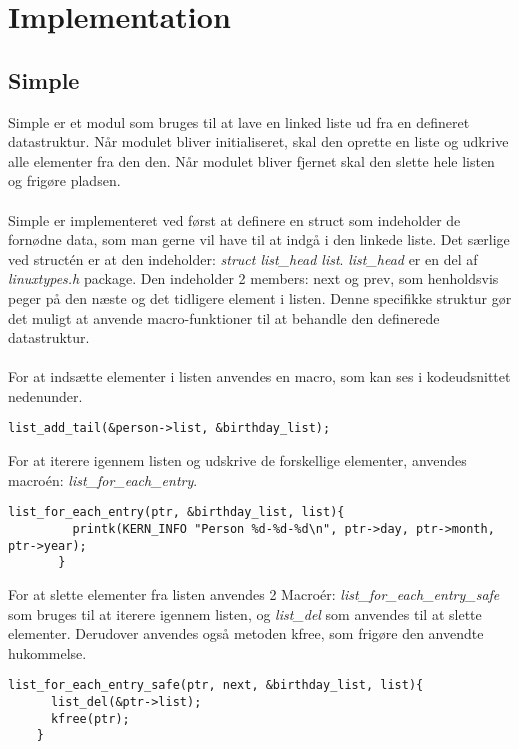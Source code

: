 \chapter{Implementation}
\section{Simple}
Simple er et modul som bruges til at lave en linked liste ud fra en defineret datastruktur. Når modulet bliver initialiseret, skal den oprette en liste og udkrive alle elementer fra den den. Når modulet bliver fjernet skal den slette hele listen og frigøre pladsen.
\\\\
Simple er implementeret ved først at definere en struct som indeholder de fornødne data, som man gerne vil have til at indgå i den linkede liste. Det særlige ved structén er at den indeholder: \textit{struct list\_head list}. \textit{list\_head} er en del af \textit{linux{types.h}} package. Den indeholder 2 members: next og prev, som henholdsvis peger på den næste og det tidligere element i listen. Denne specifikke struktur gør det muligt at anvende macro-funktioner til at behandle den definerede datastruktur.
\\\\
For at indsætte elementer i listen anvendes en macro, som kan ses i kodeudsnittet nedenunder. 

\begin{lstlisting}
list_add_tail(&person->list, &birthday_list);
\end{lstlisting}

For at iterere igennem listen og udskrive de forskellige elementer, anvendes macroén: \textit{list\_for\_each\_entry}.

\begin{lstlisting}
list_for_each_entry(ptr, &birthday_list, list){
         printk(KERN_INFO "Person %d-%d-%d\n", ptr->day, ptr->month, ptr->year);
       }
\end{lstlisting}

For at slette elementer fra listen anvendes 2 Macroér: \textit{list\_for\_each\_entry\_safe} som bruges til at iterere igennem listen, og \textit{list\_del} som anvendes til at slette elementer. Derudover anvendes også metoden kfree, som frigøre den anvendte hukommelse.

\begin{lstlisting}
list_for_each_entry_safe(ptr, next, &birthday_list, list){
	  list_del(&ptr->list);
	  kfree(ptr);
	}
\end{lstlisting}

